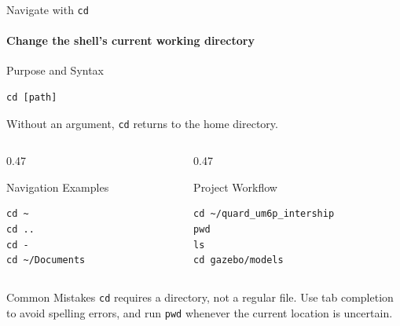 \begin{frame}[fragile]{Navigate with \texttt{cd}}
\framesubtitle{Change the shell's current working directory}

\footnotesize

\begin{block}{Purpose and Syntax}
\begin{verbatim}
cd [path]
\end{verbatim}
Without an argument, \texttt{cd} returns to the home directory.
\end{block}

\begin{columns}[T,onlytextwidth]
    \begin{column}{0.47\textwidth}
        \begin{exampleblock}{Navigation Examples}
\begin{verbatim}
cd ~
cd ..
cd -
cd ~/Documents
\end{verbatim}
        \end{exampleblock}
    \end{column}

    \begin{column}{0.47\textwidth}
        \begin{exampleblock}{Project Workflow}
\begin{verbatim}
cd ~/quard_um6p_intership
pwd
ls
cd gazebo/models
\end{verbatim}
        \end{exampleblock}
    \end{column}
\end{columns}

\begin{alertblock}{Common Mistakes}
\texttt{cd} requires a directory, not a regular file. Use tab completion to
avoid spelling errors, and run \texttt{pwd} whenever the current location is uncertain.
\end{alertblock}
\end{frame}

